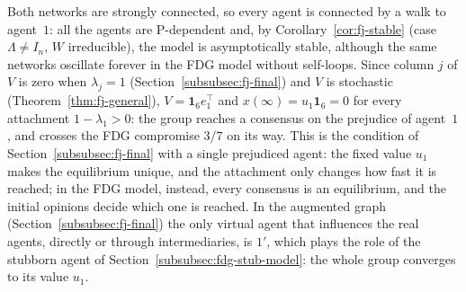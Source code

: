 Both networks are strongly connected, so every agent is connected by a walk to
agent~$1$: all the agents are P-dependent and, by Corollary~\ref{cor:fj-stable} (case
$\Lambda \neq I_n$, $W$ irreducible), the model is asymptotically stable, although the
same networks oscillate forever in the FDG model without self-loops. Since column $j$ of
$V$ is zero when $\lambda_j = 1$ (Section~\ref{subsubsec:fj-final}) and $V$ is
stochastic (Theorem~\ref{thm:fj-general}), $V = \mathbf{1}_6 e_1^\top$ and
$x(\infty) = u_1 \mathbf{1}_6 = 0$ for every attachment $1 - \lambda_1 > 0$: the group
reaches a consensus on the prejudice of agent~$1$, and crosses the FDG compromise
$3/7$ on its way.
 This is the condition of Section~\ref{subsubsec:fj-final} with a
single prejudiced agent: the fixed value $u_1$ makes the equilibrium unique, and the
attachment only changes how
fast it is reached; in the FDG model, instead, every consensus is an equilibrium, and the
initial opinions decide which one is reached. In the augmented graph
(Section~\ref{subsubsec:fj-final}) the only virtual agent that influences the real
agents, directly or through intermediaries, is $1'$,
 which plays the role of the stubborn agent
of Section~\ref{subsubsec:fdg-stub-model}: the whole group converges to its value $u_1$.
